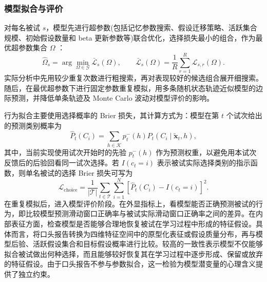 \subsubsection{模型拟合与评价}

对每名被试 $s$，模型先进行超参数(包括记忆参数搜索、假设迁移策略、活跃集合规模、初始假设数量和 beta 更新参数等)联合优化，选择损失最小的组合，作为最优超参数集合 $\Omega$ ：
\begin{equation}
    \hat{\Omega}_s
    =
    \arg\min_{\Omega\in\mathcal G}
    \bar{\mathcal L}_s(\Omega),
    \qquad
    \bar{\mathcal L}_s(\Omega)
    =
    \frac{1}{R}\sum_{r=1}^{R}\mathcal L_{s,r}(\Omega).
    \label{eq:exp1-hyper-selection}
\end{equation}
实际分析中先用较少重复次数进行粗搜索，再对表现较好的候选组合展开细搜索。随后，在最优超参数下进行固定参数重复模拟，用多条随机状态轨迹近似模型的边际预测，并降低单条轨迹及 Monte Carlo 波动对模型评价的影响。

行为拟合主要使用选择概率的 Brier 损失，其计算方式为：模型在第 $t$ 个试次给出的预测类别概率为
\begin{equation}
    \hat P_t(C_i)
    =
    \sum_{h\in\mathcal K}p_t^-(h)
    P_t(C_i\mid\tilde{\mathbf{x}}_t,h),
    \label{eq:exp1-pred-category-prob}
\end{equation}
其中，当前实现使用试次开始时的先验 $p_t^-(h)$ 作为预测权重，以避免用本试次反馈后的后验回看同一试次选择。若 $I(c_t=i)$ 表示被试实际选择类别的指示函数，则单名被试的选择 Brier 损失可写为
\begin{equation}
    \mathcal L_{\mathrm{choice}}
    =
    \frac{1}{|\mathcal T|}
    \sum_{t\in\mathcal T}
    \sum_{i=1}^{N}
    \left[\hat P_t(C_i)-I(c_t=i)\right]^2.
    \label{eq:exp1-choice-brier}
\end{equation}
在重复模拟后，进入模型评价阶段。在外显指标上，看模型能否正确预测被试的行为，即比较模型预测滑动窗口正确率与被试实际滑动窗口正确率之间的差异。在内部表征方面，检查模型是否能够合理地恢复被试在学习过程中形成的特征假设。具体而言，将口头报告转换为四维特征空间中的原型化表征或假设质量分布，再与模型后验、活跃假设集合和目标假设概率进行比较。较高的一致性表示模型不仅能够拟合被试做出何种选择，而且能够较好恢复其在学习过程中逐步形成、保留或放弃的特征假设。由于口头报告不参与参数拟合，这一检验为模型潜变量的心理含义提供了独立约束。
